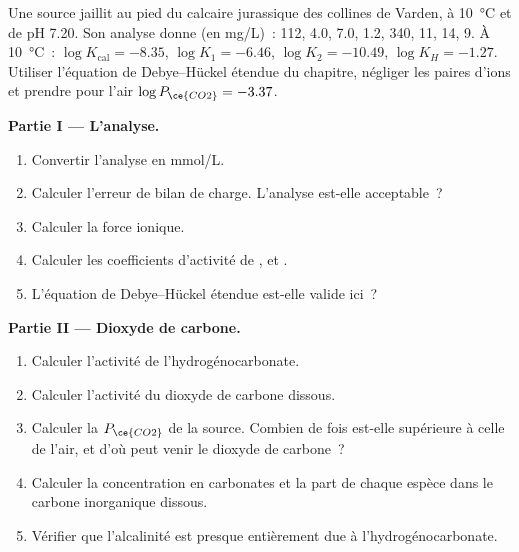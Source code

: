 \begin{problem}
\label{pb:b3:water-rock-interaction:1}
Une source jaillit au pied du calcaire jurassique des collines de Varden, à
\qty{10}{\celsius} et de pH 7.20. Son analyse donne (en \unit{mg/L})~: 
112,  4.0,  7.0,  1.2,  340,  11,
 14,  9. À \qty{10}{\celsius}~: $\log K_{\mathrm{cal}} =
-8.35$, $\log K_1 = -6.46$, $\log K_2 = -10.49$, $\log K_H = -1.27$. Utiliser
l'équation de Debye--Hückel étendue du chapitre, négliger les paires d'ions et prendre
pour l'air $\log P_{\ce{CO2}} = -3.37$.

\medskip\noindent\textbf{Partie I --- L'analyse.}
\begin{enumerate}
\item Convertir l'analyse en \unit{mmol/L}.
\item Calculer l'erreur de bilan de charge. L'analyse est-elle acceptable~?
\item Calculer la force ionique.
\item Calculer les coefficients d'activité de ,  et
  .
\item L'équation de Debye--Hückel étendue est-elle valide ici~?
\end{enumerate}

\medskip\noindent\textbf{Partie II --- Dioxyde de carbone.}
\begin{enumerate}[resume]
\item Calculer l'activité de l'hydrogénocarbonate.
\item Calculer l'activité du dioxyde de carbone dissous.
\item Calculer la $P_{\ce{CO2}}$ de la source. Combien de fois est-elle supérieure
  à celle de l'air, et d'où peut venir le dioxyde de carbone~?
\item Calculer la concentration en carbonates et la part de chaque espèce dans
  le carbone inorganique dissous.
\item Vérifier que l'alcalinité est presque entièrement due à l'hydrogénocarbonate.
\end{enumerate}


\end{problem}

